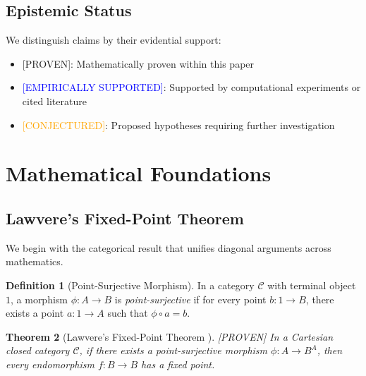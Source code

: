 \documentclass[11pt,a4paper]{article}
\newtheorem{theorem}{Theorem}[section]
\theoremstyle{definition}
\newtheorem{definition}[theorem]{Definition}
\theoremstyle{remark}
\newcommand{\C}{\mathcal{C}}
\newcommand{\proven}{\textcolor{green!50!black}{[PROVEN]}}
\newcommand{\supported}{\textcolor{blue}{[EMPIRICALLY SUPPORTED]}}
\newcommand{\conjectured}{\textcolor{orange}{[CONJECTURED]}}
\begin{document}
\subsection{Epistemic Status}

We distinguish claims by their evidential support:
\begin{itemize}
    \item \proven: Mathematically proven within this paper
    \item \supported: Supported by computational experiments or cited literature
    \item \conjectured: Proposed hypotheses requiring further investigation
\end{itemize}

\section{Mathematical Foundations}
\label{sec:foundations}

\subsection{Lawvere's Fixed-Point Theorem}

We begin with the categorical result that unifies diagonal arguments across mathematics.

\begin{definition}[Point-Surjective Morphism]
In a category $\C$ with terminal object $1$, a morphism $\phi: A \to B$ is \emph{point-surjective} if for every point $b: 1 \to B$, there exists a point $a: 1 \to A$ such that $\phi \circ a = b$.
\end{definition}

\begin{theorem}[Lawvere's Fixed-Point Theorem \cite{lawvere1969diagonal}] \proven
\label{thm:lawvere}
In a Cartesian closed category $\C$, if there exists a point-surjective morphism $\phi: A \to B^A$, then every endomorphism $f: B \to B$ has a fixed point.
\end{theorem}
\end{document}
